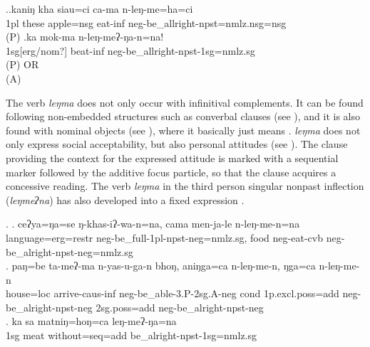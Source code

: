 \ex.\ag.kaniŋ kha siau=ci ca-ma n-leŋ-me=ha=ci\\
{\sc 1pl} these apple{\sc =nsg} eat{\sc -inf} {\sc neg-}be\_allright{\sc -npst=nmlz.nsg=nsg}\\
 (P)
\bg.ka mok-ma n-leŋ-meʔ-ŋa-n=na!\\
{\sc 1sg[erg/nom?]} beat{\sc -inf} {\sc neg-}be\_allright{\sc -npst-1sg=nmlz.sg}\\
 (P) OR\\
 (A)


The verb \emph{leŋma} does not only occur with infinitival complements. It can be found following non-embedded structures such as converbal clauses (see \Next[a]), and it is also found with nominal objects (see \Next[b]), where it basically just means . \emph{leŋma} does not only express social acceptability, but also personal attitudes (see \Next[c]). The clause providing the context for the expressed attitude is marked with a sequential marker followed by the additive focus particle, so that the clause acquires a concessive reading. The verb \emph{leŋma} in the third person singular nonpast inflection (\emph{leŋmeʔna}) has also developed into a fixed expression . 
	

\ex. \ag. ceʔya=ŋa=se ŋ-khas-iʔ-wa-n=na, cama men-ja-le n-leŋ-me-n=na\\
		language{\sc =erg=restr} {\sc neg}-be\_full-{\sc 1pl-npst-neg=nmlz.sg}, food	 {\sc neg-}eat{\sc -cvb}	{\sc neg-}be\_alright{\sc [3sg]-npst-neg=nmlz.sg}	\\ 
\bg. paŋ=be     ta-meʔ-ma           n-yas-u-ga-n bhoŋ,  aniŋga=ca n-leŋ-me-n, ŋga=ca n-leŋ-me-n\\
	house{\sc =loc} arrive{\sc -caus-inf} {\sc neg-}be\_able-{\sc 3.P-2sg.A-neg} {\sc cond} {\sc 1p.excl.poss=add} {\sc neg}-be\_alright{\sc [3sg]-npst-neg} {\sc 2sg.poss=add} {\sc neg}-be\_alright{\sc [3sg]-npst-neg} 	\\
	 
	\bg. ka sa matniŋ=hoŋ=ca leŋ-meʔ-ŋa=na\\
{\sc 1sg} meat without{\sc =seq=add} be\_alright{\sc -npst-1sg=nmlz.sg}\\



